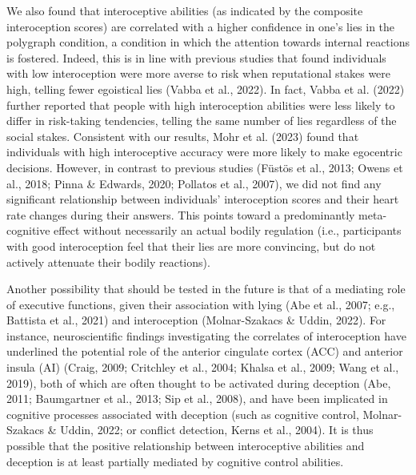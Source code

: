 \documentclass[
  man,mask,floatsintext]{apa6}
\begin{document}
We also found that interoceptive abilities (as indicated by the composite interoception scores) are correlated with a higher confidence in one's lies in the polygraph condition, a condition in which the attention towards internal reactions is fostered. Indeed, this is in line with previous studies that found individuals with low interoception were more averse to risk when reputational stakes were high, telling fewer egoistical lies (Vabba et al., 2022). In fact, Vabba et al. (2022) further reported that people with high interoception abilities were less likely to differ in risk-taking tendencies, telling the same number of lies regardless of the social stakes. Consistent with our results, Mohr et al. (2023) found that individuals with high interoceptive accuracy were more likely to make egocentric decisions. However, in contrast to previous studies (Füstös et al., 2013; Owens et al., 2018; Pinna \& Edwards, 2020; Pollatos et al., 2007), we did not find any significant relationship between individuals' interoception scores and their heart rate changes during their answers. This points toward a predominantly meta-cognitive effect without necessarily an actual bodily regulation (i.e., participants with good interoception feel that their lies are more convincing, but do not actively attenuate their bodily reactions).

Another possibility that should be tested in the future is that of a mediating role of executive functions, given their association with lying (Abe et al., 2007; e.g., Battista et al., 2021) and interoception (Molnar-Szakacs \& Uddin, 2022). For instance, neuroscientific findings investigating the correlates of interoception have underlined the potential role of the anterior cingulate cortex (ACC) and anterior insula (AI) (Craig, 2009; Critchley et al., 2004; Khalsa et al., 2009; Wang et al., 2019), both of which are often thought to be activated during deception (Abe, 2011; Baumgartner et al., 2013; Sip et al., 2008), and have been implicated in cognitive processes associated with deception (such as cognitive control, Molnar-Szakacs \& Uddin, 2022; or conflict detection, Kerns et al., 2004). It is thus possible that the positive relationship between interoceptive abilities and deception is at least partially mediated by cognitive control abilities.
\end{document}
